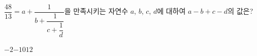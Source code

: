\hspace*{2mm}\begin{minipage}[t]{\dimexpr\linewidth-2mm\relax}\vspace{0pt}
$\dfrac{48}{13}=a+\dfrac{1}{b+\dfrac{1}{c+\dfrac{1}{d}}}$을 만족시키는 자연수 $a$, $b$, $c$, $d$에 대하여 $a-b+c-d$의 값은?
\begin{choices32}{$-2$}{$-1$}{$0$}{$1$}{$2$}\end{choices32}\end{minipage}
